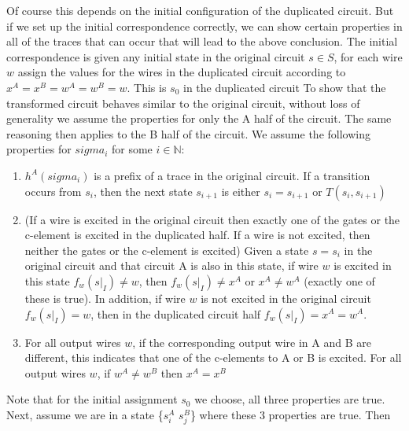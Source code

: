 \documentclass{article}
\begin{document}
Of course this depends on the initial configuration of the duplicated circuit.  But if we set up the initial correspondence correctly, we can show certain properties in all of the traces that can occur that will lead to the above conclusion.
\newline
The initial correspondence is given any initial state in the original circuit $s \in S$, for each wire $w$ assign the values for the wires in the duplicated circuit according to $x^A=x^B=w^A=w^B=w$.  This is $s_0$ in the duplicated circuit\newline
To show that the transformed circuit behaves similar to the original circuit, without loss of generality we assume the properties for only the A half of the circuit.  The same reasoning then applies to the B half of the circuit.  We assume the following properties for $sigma_i$ for some $i \in \mathbb{N}$:
\begin{enumerate} %
\item   $h^A(sigma_i)$ is a prefix of a trace in the original circuit.  If a transition occurs from $s_i$, then the next state $s_{i+1}$ is either $s_i=s_{i+1}$ or $T(s_i,s_{i+1})$  %
\item  (If a wire is excited in the original circuit then exactly one of the gates or the c-element is excited in the duplicated half.  If a wire is not excited, then neither the gates or the c-element is excited) Given a state $s=s_i$ in the original circuit and that circuit A is also in this state, if wire $w$ is excited in this state $f_w(s|_I)\neq w$, then $f_w(s|_I) \neq x^A$ or $x^A \neq w^A$ (exactly one of these is true).  
In addition, if wire $w$ is not excited in the original circuit $f_w(s|_I)=w$, then in the duplicated circuit half $f_w(s|_I)=x^A=w^A$.  %
\item  For all output wires $w$, if the corresponding output wire in A and B are different, this indicates that one of the c-elements to A or B is excited.  For all output wires $w$, if $w^A\neq w^B$ then $x^A=x^B$ 
\end{enumerate}
Note that for the initial assignment $s_0$ we choose, all three properties are true.
Next, assume we are in a state \{$s_i^A$ $s_j^B$\} where these 3 properties are true.  Then 
\end{document}

